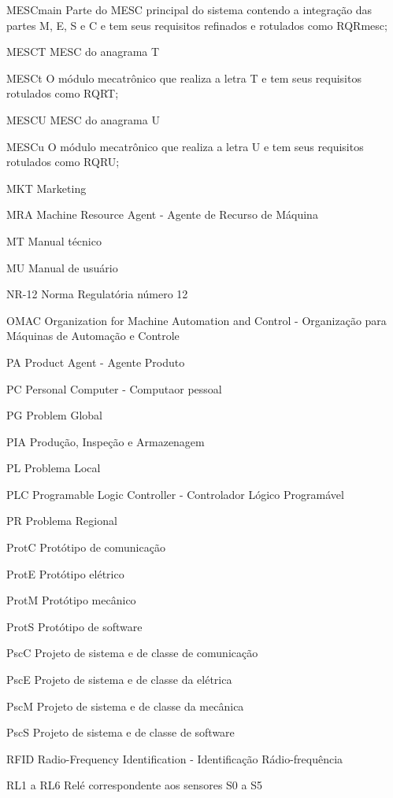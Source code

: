 \documentclass[
12pt,				%
openright,			%
oneside,			%
a4paper,			%
english,			%
brazil				%
]{abntex2}
\begin{document}
\begin{siglas}
\item[MESCmain] Parte do MESC principal do sistema contendo a integração das partes M, E, S e C e tem seus requisitos refinados e rotulados como RQRmesc;
\item[MESCT] MESC do anagrama T
\item[MESCt] O módulo mecatrônico que realiza a letra T e tem seus requisitos rotulados como RQRT;
\item[MESCU] MESC do anagrama U
\item[MESCu] O módulo mecatrônico que realiza a letra U e tem seus requisitos rotulados como RQRU;
\item[MKT] Marketing
\item[MRA] Machine Resource Agent - Agente de Recurso de Máquina
\item[MT] Manual técnico
\item[MU] Manual de usuário
\item[NR-12] Norma Regulatória número 12
\item[OMAC] Organization for Machine Automation and Control - Organização para Máquinas de Automação e Controle
\item[PA ]Product Agent - Agente Produto
\item[PC] Personal Computer - Computaor pessoal
\item[PG] Problem Global
\item[PIA] Produção, Inspeção e Armazenagem
\item[PL] Problema Local
\item[PLC] Programable Logic Controller - Controlador Lógico Programável
\item[PR] Problema Regional
\item[ProtC] Protótipo de comunicação
\item[ProtE] Protótipo elétrico
\item[ProtM] Protótipo mecânico
\item[ProtS] Protótipo de software
\item[PscC] Projeto de sistema e de classe de comunicação
\item[PscE] Projeto de sistema e de classe da elétrica
\item[PscM] Projeto de sistema e de classe da mecânica
\item[PscS] Projeto de sistema e de classe de software
\item[RFID] Radio-Frequency Identification - Identificação Rádio-frequência
\item[RL1 a RL6] Relé correspondente aos sensores S0 a S5

\end{siglas}
\end{document}
